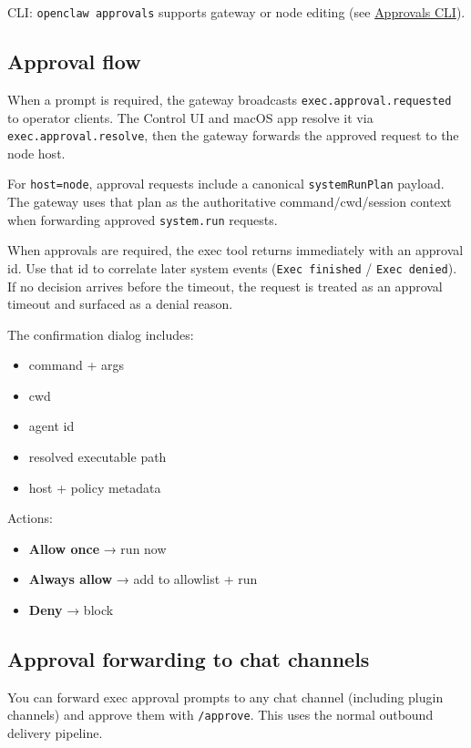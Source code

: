 CLI: \texttt{openclaw approvals} supports gateway or node editing (see \href{/cli/approvals}{Approvals CLI}).

\subsection{Approval flow}


When a prompt is required, the gateway broadcasts \texttt{exec.approval.requested} to operator clients.
The Control UI and macOS app resolve it via \texttt{exec.approval.resolve}, then the gateway forwards the
approved request to the node host.

For \texttt{host=node}, approval requests include a canonical \texttt{systemRunPlan} payload. The gateway uses
that plan as the authoritative command/cwd/session context when forwarding approved \texttt{system.run}
requests.

When approvals are required, the exec tool returns immediately with an approval id. Use that id to
correlate later system events (\texttt{Exec finished} / \texttt{Exec denied}). If no decision arrives before the
timeout, the request is treated as an approval timeout and surfaced as a denial reason.

The confirmation dialog includes:

\begin{itemize}
  \item command + args
  \item cwd
  \item agent id
  \item resolved executable path
  \item host + policy metadata
\end{itemize}


Actions:

\begin{itemize}
  \item \textbf{Allow once} → run now
  \item \textbf{Always allow} → add to allowlist + run
  \item \textbf{Deny} → block
\end{itemize}


\subsection{Approval forwarding to chat channels}


You can forward exec approval prompts to any chat channel (including plugin channels) and approve
them with \texttt{/approve}. This uses the normal outbound delivery pipeline.

